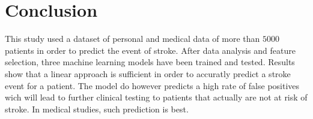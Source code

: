 \section{Conclusion}
This study used a dataset of personal and medical data of more than $5 000$ patients in order to 
predict the event of stroke. After data analysis and feature selection, three machine learning models 
have been trained and tested. Results show that a linear approach is sufficient in order to accuratly 
predict a stroke event for a patient. The model do however predicts a high rate of false positives 
wich will lead to further clinical testing to patients that actually are not at risk of stroke. In 
medical studies, such prediction is best. 
